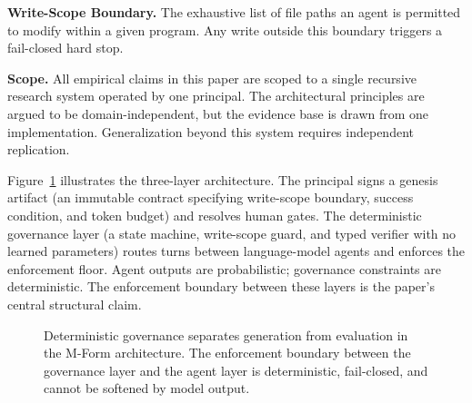 \documentclass[11pt]{article}
\begin{document}
\textbf{Write-Scope Boundary.} The exhaustive list of file paths an agent is permitted to modify within a given program. Any write outside this boundary triggers a fail-closed hard stop.

\textbf{Scope.} All empirical claims in this paper are scoped to a single recursive research system operated by one principal. The architectural principles are argued to be domain-independent, but the evidence base is drawn from one implementation. Generalization beyond this system requires independent replication.

Figure~\ref{fig:architecture} illustrates the three-layer architecture. The principal signs a genesis artifact (an immutable contract specifying write-scope boundary, success condition, and token budget) and resolves human gates. The deterministic governance layer (a state machine, write-scope guard, and typed verifier with no learned parameters) routes turns between language-model agents and enforces the enforcement floor. Agent outputs are probabilistic; governance constraints are deterministic. The enforcement boundary between these layers is the paper's central structural claim.

\begin{figure}[H]
\centering
{}
\caption{Deterministic governance separates generation from evaluation in the M-Form architecture. The enforcement boundary between the governance layer and the agent layer is deterministic, fail-closed, and cannot be softened by model output.}
\label{fig:architecture}
\end{figure}
\end{document}
